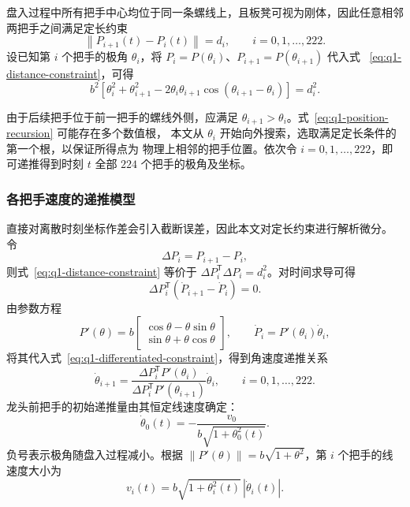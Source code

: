\documentclass[UTF8,fontset=windows,a4paper,12pt]{ctexart}
\begin{document}
盘入过程中所有把手中心均位于同一条螺线上，且板凳可视为刚体，因此任意相邻
两把手之间满足定长约束
\begin{equation}
  \left\|P_{i+1}(t)-P_i(t)\right\|=d_i,
  \qquad i=0,1,\ldots,222.
  \label{eq:q1-distance-constraint}
\end{equation}
设已知第 $i$ 个把手的极角 $\theta_i$，将
$P_i=P(\theta_i)$、$P_{i+1}=P(\theta_{i+1})$ 代入式
~\eqref{eq:q1-distance-constraint}，可得
\begin{equation}
  b^2\left[
    \theta_i^2+\theta_{i+1}^2
    -2\theta_i\theta_{i+1}
      \cos(\theta_{i+1}-\theta_i)
  \right]=d_i^2.
  \label{eq:q1-position-recursion}
\end{equation}

由于后续把手位于前一把手的螺线外侧，应满足
$\theta_{i+1}>\theta_i$。式~\eqref{eq:q1-position-recursion} 可能存在多个数值根，
本文从 $\theta_i$ 开始向外搜索，选取满足定长条件的第一个根，以保证所得点为
物理上相邻的把手位置。依次令 $i=0,1,\ldots,222$，即可递推得到时刻 $t$
全部 $224$ 个把手的极角及坐标。

\subsubsection{各把手速度的递推模型}

直接对离散时刻坐标作差会引入截断误差，因此本文对定长约束进行解析微分。
令
\begin{equation}
  \Delta P_i=P_{i+1}-P_i,
\end{equation}
则式~\eqref{eq:q1-distance-constraint} 等价于
$\Delta P_i^\mathsf{T}\Delta P_i=d_i^2$。对时间求导可得
\begin{equation}
  \Delta P_i^\mathsf{T}
  \left(\dot P_{i+1}-\dot P_i\right)=0.
  \label{eq:q1-differentiated-constraint}
\end{equation}
由参数方程
\begin{equation}
  P'(\theta)
  =b
  \begin{bmatrix}
    \cos\theta-\theta\sin\theta\\
    \sin\theta+\theta\cos\theta
  \end{bmatrix},
  \qquad
  \dot P_i=P'(\theta_i)\dot\theta_i,
  \label{eq:q1-derivative}
\end{equation}
将其代入式~\eqref{eq:q1-differentiated-constraint}，得到角速度递推关系
\begin{equation}
  \dot\theta_{i+1}
  =\frac{
    \Delta P_i^\mathsf{T}P'(\theta_i)
  }{
    \Delta P_i^\mathsf{T}P'(\theta_{i+1})
  }\dot\theta_i,
  \qquad i=0,1,\ldots,222.
  \label{eq:q1-angular-velocity}
\end{equation}
龙头前把手的初始递推量由其恒定线速度确定：
\begin{equation}
  \dot\theta_0(t)
  =-\frac{v_0}{b\sqrt{1+\theta_0^2(t)}}.
  \label{eq:q1-head-angular-velocity}
\end{equation}
负号表示极角随盘入过程减小。根据
$\|P'(\theta)\|=b\sqrt{1+\theta^2}$，第 $i$ 个把手的线速度大小为
\begin{equation}
  v_i(t)
  =b\sqrt{1+\theta_i^2(t)}\,
   \left|\dot\theta_i(t)\right|.
  \label{eq:q1-linear-velocity}
\end{equation}
\end{document}
